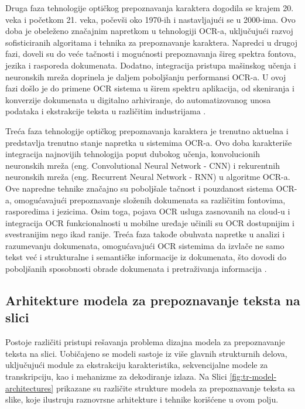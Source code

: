\documentclass[a4paper,12pt]{article}
\begin{document}
	Druga faza tehnologije optičkog prepoznavanja karaktera dogodila se krajem 20. veka i početkom 21. veka, počevši oko 1970-ih i nastavljajući se u 2000-ima. Ovo doba je obeleženo značajnim napretkom u tehnologiji OCR-a, uključujući razvoj sofisticiranih algoritama i tehnika za prepoznavanje karaktera. Napredci u drugoj fazi, doveli su do veće tačnosti i mogućnosti prepoznavanja šireg spektra fontova, jezika i rasporeda dokumenata. Dodatno, integracija pristupa mašinskog učenja i neuronskih mreža doprinela je daljem poboljšanju performansi OCR-a. U ovoj fazi došlo je do primene OCR sistema u širem spektru aplikacija, od skeniranja i konverzije dokumenata u digitalno arhiviranje, do automatizovanog unosa podataka i ekstrakcije teksta u različitim industrijama \cite{historyOfOCR}.
	
	Treća faza tehnologije optičkog prepoznavanja karaktera je trenutno aktuelna i predstavlja trenutno stanje napretka u sistemima OCR-a. Ovo doba karakteriše integracija najnovijih tehnologija poput dubokog učenja, konvolucionih neuronskih mreža (eng. Convolutional Neural Network - CNN) i rekurentnih neuronskih mreža (eng. Recurrent Neural Network - RNN) u algoritme OCR-a. Ove napredne tehnike značajno su poboljšale tačnost i pouzdanost sistema OCR-a, omogućavajući prepoznavanje složenih dokumenata sa različitim fontovima, rasporedima i jezicima. Osim toga, pojava OCR usluga zasnovanih na cloud-u i integracija OCR funkcionalnosti u mobilne uređaje učinili su OCR dostupnijim i svestranijim nego ikad ranije. Treća faza takođe obuhvata napretke u analizi i razumevanju dokumenata, omogućavajući OCR sistemima da izvlače ne samo tekst već i strukturalne i semantičke informacije iz dokumenata, što dovodi do poboljšanih sposobnosti obrade dokumenata i pretraživanja informacija \cite{article2021}.
	
	\subsection{Arhitekture modela za prepoznavanje teksta na slici}
	
	Postoje različiti pristupi rešavanja problema dizajna modela za prepoznavanje teksta na slici. Uobičajeno se modeli sastoje iz više glavnih strukturnih delova, uključujući module za ekstrakciju karakteristika, sekvencijalne modele za transkripciju, kao i mehanizme za dekodiranje izlaza. Na Slici \ref{fig:tr-model-architectures} prikazane su različite strukture modela za prepoznavanje teksta sa slike, koje ilustruju raznovrsne arhitekture i tehnike korišćene u ovom polju.
	
\end{document}
